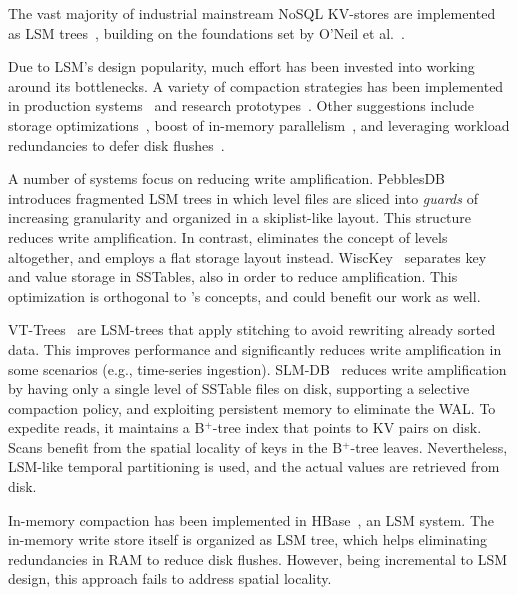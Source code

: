 

The vast majority of industrial mainstream NoSQL KV-stores are  implemented as LSM trees~\cite{hbase, 
RocksDB, scylladb, Bigtable2008, cassandra2010}, building on the foundations set by O'Neil 
et al.~\cite{DBLP:journals/acta/ONeilCGO96, Muth1998}. 

Due to LSM's design popularity, much effort has been invested into working around its bottlenecks.
A variety of compaction strategies has been implemented in production systems~\cite{CallaghanCompaction, 
ScyllaCompaction} and research prototypes~\cite{triad, PebblesDB, vttrees, slmdb}. Other suggestions include storage
optimizations~\cite{WiscKey, PebblesDB, vttrees, slmdb}, boost of in-memory parallelism~\cite{scylladb, clsm2015}, and leveraging 
 workload redundancies to defer disk flushes~\cite{triad, accordion}. 

A number of systems focus on reducing write amplification.
PebblesDB~\cite{PebblesDB} introduces fragmented LSM trees in which level files are 
sliced into {\em guards\/} of increasing granularity and organized in a skiplist-like layout. This structure 
reduces write amplification. In contrast, \sys\/ eliminates the concept of levels altogether, 
and employs a flat storage layout instead. WiscKey~\cite{WiscKey} separates key and value storage 
in SSTables, also in order to reduce amplification. This optimization is orthogonal to \sys's concepts,
and could benefit our work as well. 

VT-Trees~\cite{vttrees} are LSM-trees that apply stitching to avoid rewriting already sorted data. This improves performance and significantly reduces write amplification 
in some scenarios (e.g., time-series ingestion). 
SLM-DB~\cite{slmdb} reduces write amplification by having only a single level of SSTable files on disk, supporting a selective compaction policy, and
exploiting persistent memory to eliminate the WAL. To expedite reads, it maintains a B$^+$-tree index that points to KV pairs on disk. Scans benefit from the spatial locality of keys in the B$^+$-tree leaves. Nevertheless, LSM-like temporal partitioning is used, and the actual values are retrieved from disk.

In-memory compaction has been implemented in HBase~\cite{accordion}, an LSM system.
The in-memory write store itself is organized as LSM tree, which helps eliminating redundancies 
in RAM to reduce disk flushes. However, being incremental to LSM design, 
this approach fails to address spatial locality. 

